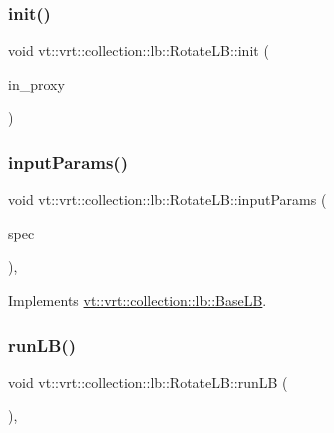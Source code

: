 \subsubsection{\texorpdfstring{init()}{init()}}
{\footnotesize\ttfamily void vt\+::vrt\+::collection\+::lb\+::\+Rotate\+L\+B\+::init (\begin{DoxyParamCaption}\item[{\hyperlink{structvt_1_1objgroup_1_1proxy_1_1_proxy}{objgroup\+::proxy\+::\+Proxy}$<$ \hyperlink{structvt_1_1vrt_1_1collection_1_1lb_1_1_rotate_l_b}{Rotate\+LB} $>$}]{in\+\_\+proxy }\end{DoxyParamCaption})}

\mbox{\label{structvt_1_1vrt_1_1collection_1_1lb_1_1_rotate_l_b_a70fc0a77f387632fc57805950b63f443}} 
\subsubsection{\texorpdfstring{input\+Params()}{inputParams()}}
{\footnotesize\ttfamily void vt\+::vrt\+::collection\+::lb\+::\+Rotate\+L\+B\+::input\+Params (\begin{DoxyParamCaption}\item[{\hyperlink{structvt_1_1vrt_1_1collection_1_1balance_1_1_spec_entry}{balance\+::\+Spec\+Entry} $\ast$}]{spec }\end{DoxyParamCaption})\hspace{0.3cm}{\ttfamily [override]}, {\ttfamily [virtual]}}



Implements \hyperlink{structvt_1_1vrt_1_1collection_1_1lb_1_1_base_l_b_a555e29aadfd428383464d6dd007506b6}{vt\+::vrt\+::collection\+::lb\+::\+Base\+LB}.

\mbox{\label{structvt_1_1vrt_1_1collection_1_1lb_1_1_rotate_l_b_a853cb29e5dbe8164ad96a33fade9cc44}} 
\subsubsection{\texorpdfstring{run\+L\+B()}{runLB()}}
{\footnotesize\ttfamily void vt\+::vrt\+::collection\+::lb\+::\+Rotate\+L\+B\+::run\+LB (\begin{DoxyParamCaption}{ }\end{DoxyParamCaption})\hspace{0.3cm}{\ttfamily [override]}, {\ttfamily [virtual]}}



